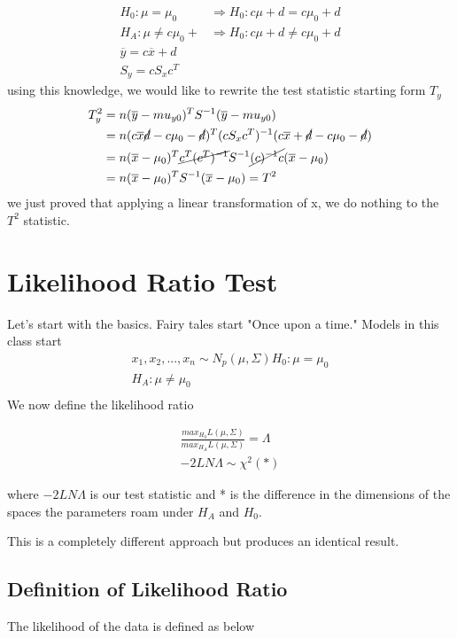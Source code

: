 \begin{align*}
    H_0: \mu = \mu_0 &\Rightarrow H_0: c\mu+d = c\mu_0+d\\
    H_A: \mu \neq c\mu_0+ &\Rightarrow H_0: c\mu+d \neq c\mu_0+d\\
    \overline{y}= c\overline{x}+d \\
    S_y = cS_xc^T
\end{align*}
using this knowledge, we would like to rewrite the test statistic starting form $T_y$
\begin{align*}
    T_y^2 &= n(\overline{y}-mu_{y0})^TS^{-1}(\overline{y}-mu_{y0})\\
    &= n(c\overline{x} \cancel{d} - c\mu_0-\cancel{d})^T (cS_xc^T)^{-1}(c\overline{x}+\cancel{d} - c\mu_0-\cancel{d})\\
    &= n(\overline{x} - \mu_0)^T\cancel{c^T(c^T)^{-1}}S^{-1}\cancel{(c)^{-1}c}(\overline{x} - \mu_0)\\
    &= n(\overline{x} - \mu_0)^T S^{-1} (\overline{x} - \mu_0) = T^2
\end{align*}
we just proved that applying a linear transformation of x, we do nothing to the $T^2$ statistic.

\section{Likelihood Ratio Test}
Let's start with the basics. Fairy tales start "Once upon a time." Models in this class start 
\begin{gather*}
x_1,x_2,...,x_n \sim N_p(\mu,\Sigma)
    H_0: \mu = \mu_0\\
    H_A: \mu \neq \mu_0\\
\end{gather*}
We now define the likelihood ratio

\begin{gather*}
    \frac{max_{H_0}L(\mu,\Sigma)}{max_{H_A}L(\mu,\Sigma)} = \Lambda \\
    -2LN\Lambda \sim \chi^2(*)
\end{gather*}

where $-2LN\Lambda$ is our test statistic and * is the difference in the dimensions of the spaces the parameters roam under $H_A$ and $H_0$.

This is a completely different approach but produces an identical result.

\subsection{Definition of Likelihood Ratio}
The likelihood of the data is defined as below

